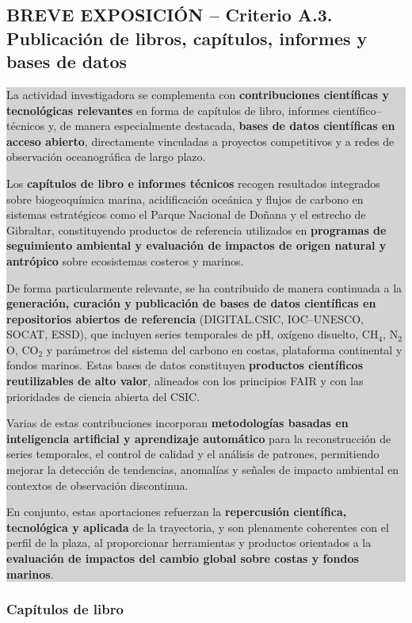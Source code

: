 \documentclass[11pt,a4paper]{article}
\newcommand{\breveexposicion}[2]{
    \subsection*{\color{darkgray}\textbf{BREVE EXPOSICIÓN -- #1}}
    \vspace{0.3em}
    \noindent\colorbox{lightgray}{%
        \begin{minipage}{0.97\textwidth}
        \vspace{0.5em}
        \color{darkgray}
        #2
        \vspace{0.5em}
        \end{minipage}
    }
    \vspace{1em}
}
\begin{document}
\breveexposicion{Criterio A.3. Publicación de libros, capítulos, informes y bases de datos}{
La actividad investigadora se complementa con \textbf{contribuciones científicas y tecnológicas relevantes} en forma de capítulos de libro, informes científico--técnicos y, de manera especialmente destacada, \textbf{bases de datos científicas en acceso abierto}, directamente vinculadas a proyectos competitivos y a redes de observación oceanográfica de largo plazo.

Los \textbf{capítulos de libro e informes técnicos} recogen resultados integrados sobre biogeoquímica marina, acidificación oceánica y flujos de carbono en sistemas estratégicos como el Parque Nacional de Doñana y el estrecho de Gibraltar, constituyendo productos de referencia utilizados en \textbf{programas de seguimiento ambiental y evaluación de impactos de origen natural y antrópico} sobre ecosistemas costeros y marinos.

De forma particularmente relevante, se ha contribuido de manera continuada a la \textbf{generación, curación y publicación de bases de datos científicas en repositorios abiertos de referencia} (DIGITAL.CSIC, IOC--UNESCO, SOCAT, ESSD), que incluyen series temporales de pH, oxígeno disuelto, CH$_4$, N$_2$O, CO$_2$ y parámetros del sistema del carbono en costas, plataforma continental y fondos marinos. Estas bases de datos constituyen \textbf{productos científicos reutilizables de alto valor}, alineados con los principios FAIR y con las prioridades de ciencia abierta del CSIC.

Varias de estas contribuciones incorporan \textbf{metodologías basadas en inteligencia artificial y aprendizaje automático} para la reconstrucción de series temporales, el control de calidad y el análisis de patrones, permitiendo mejorar la detección de tendencias, anomalías y señales de impacto ambiental en contextos de observación discontinua.

En conjunto, estas aportaciones refuerzan la \textbf{repercusión científica, tecnológica y aplicada} de la trayectoria, y son plenamente coherentes con el perfil de la plaza, al proporcionar herramientas y productos orientados a la \textbf{evaluación de impactos del cambio global sobre costas y fondos marinos}.
}
\subsubsection{Capítulos de libro}
\end{document}
